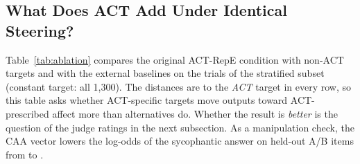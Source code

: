 \documentclass[letterpaper]{article} %
\begin{document}
\subsection{What Does ACT Add Under Identical Steering?}

Table~\ref{tab:ablation} compares the original ACT-RepE condition with non-ACT targets and with the external baselines on the \SubsetTrials{} trials of the stratified subset (constant target: all 1,300). The distances are to the \emph{ACT} target in every row, so this table asks whether ACT-specific targets move outputs toward ACT-prescribed affect more than alternatives do. Whether the result is \emph{better} is the question of the judge ratings in the next subsection. As a manipulation check, the CAA vector lowers the log-odds of the sycophantic answer on held-out A/B items from \CaaHeldoutBase{} to \CaaHeldoutSteered{}.

\begin{table}[t]
\centering
\caption{ACT ablations and baselines on Llama-3.1-8B. ``Dist.'' is mean overall distance to the ACT target (own reader on the first 500 characters; independent Ministral reader). The next column is the condition's distance minus ACT-RepE's (positive = ACT-RepE closer; 95\% CI). $b_1^P$ is the Potency tracking slope; $\Delta P_{\mathrm{obs}}$ is the observed Potency difference between high- and low-status agents on role-reversed pairs (ACT target difference: \RoleRepeonlyTarget).}
\label{tab:ablation}
\small

\end{table}
\end{document}
